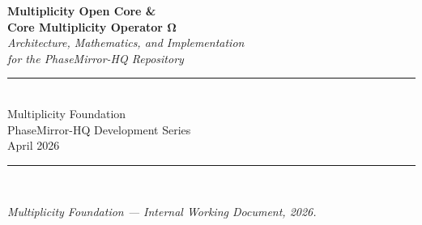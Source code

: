 \documentclass[12pt,a4paper]{article}
\theoremstyle{plain}
\theoremstyle{definition}
\theoremstyle{remark}
\newcommand{\Hil}{\mathcal{H}}
\newcommand{\PP}{\mathbb{P}}
\begin{document}
\begin{titlepage}
\centering
\vspace*{1.5cm}
{\LARGE\bfseries Multiplicity Open Core \&\\[0.4em]
Core Multiplicity Operator $\boldsymbol{\Omega}$}\\[0.8cm]
{\large\itshape Architecture, Mathematics, and Implementation\\
for the PhaseMirror-HQ Repository}\\[1.2cm]
\rule{0.6\textwidth}{0.5pt}\\[0.8cm]
{\large Multiplicity Foundation}\\[0.3em]
{\normalsize PhaseMirror-HQ Development Series}\\[0.3em]
{\normalsize April 2026}\\[1.2cm]
\rule{0.6\textwidth}{0.5pt}\\[1cm]
\begin{abstract}
\noindent
This report documents the architectural and mathematical developments
converging on a unified simulator substrate for Multiplicity Theory,
as evolved across a focused design sprint in April 2026.
Three separate sectoral engines---the \emph{Four-Prime Newton Holography},
the \emph{Computational Resonance Multiplicity Framework} (CRMF), and
the \emph{Genomic Analogy of an AGI Immune System}---are shown to
share a minimal invariant pattern: \textbf{visible indexed generators
+ latent stabilizer + lawful projection}.
This pattern is elevated into the \textbf{Multiplicity Open Core} (MOC),
a three-slot simulator interface with an optional certification layer.
At the operator level, the \textbf{Core Multiplicity Operator}
$\boldsymbol{\Omega}$ is defined on a prime-graded Hilbert bundle
$\Hil = \bigoplus_{p\in\PP}\Hil_p \otimes L^{2}(\mathbb{R})\otimes\mathbb{C}^{d}$
and shown to specialize to every existing subsystem via lawful
restriction functors $R_s$.
The target implementation home is
\texttt{multiplicity/multiplicity-Core/} inside PhaseMirror-HQ,
where the directory already contains algebraic, semiring, and spectral
substrate files.
The report provides the full mathematical framework, production-grade
Python skeleton, sector reduction table, and a fastest-path
validation strategy.
\end{abstract}
\vfill
{\small\textit{Multiplicity Foundation --- Internal Working Document, 2026.}}
\end{titlepage}
\end{document}
